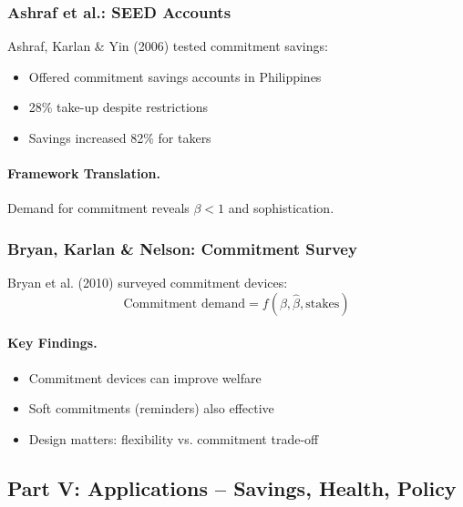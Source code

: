 \subsubsection{Ashraf et al.: SEED Accounts}

Ashraf, Karlan \& Yin (2006) tested commitment savings:
\begin{itemize}
    \item Offered commitment savings accounts in Philippines
    \item 28\% take-up despite restrictions
    \item Savings increased 82\% for takers
\end{itemize}

\paragraph{Framework Translation.}
Demand for commitment reveals $\beta < 1$ and sophistication.

\subsubsection{Bryan, Karlan \& Nelson: Commitment Survey}

Bryan et al. (2010) surveyed commitment devices:
\begin{equation}
\text{Commitment demand} = f(\beta, \hat{\beta}, \text{stakes})
\end{equation}

\paragraph{Key Findings.}
\begin{itemize}
    \item Commitment devices can improve welfare
    \item Soft commitments (reminders) also effective
    \item Design matters: flexibility vs. commitment trade-off
\end{itemize}

\subsection{Part V: Applications – Savings, Health, Policy}

